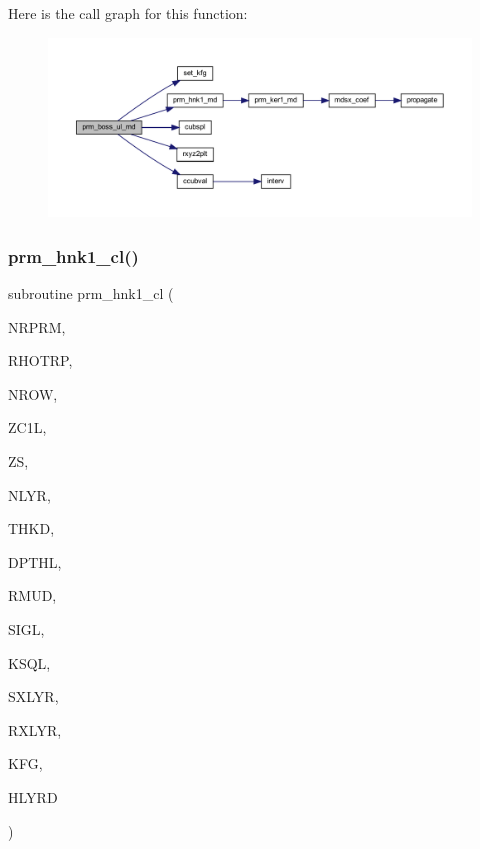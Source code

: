 Here is the call graph for this function\+:\nopagebreak
\begin{figure}[H]
\begin{center}
\leavevmode
\includegraphics[width=350pt]{Leroi__c_8f90_ab6689c64fba851d3db437dbd7fc0d13a_cgraph}
\end{center}
\end{figure}
\mbox{\label{Leroi__c_8f90_a5285d5a2942c499f6219805b1e689588}} 
\subsubsection{\texorpdfstring{prm\+\_\+hnk1\+\_\+cl()}{prm\_hnk1\_cl()}}
{\footnotesize\ttfamily subroutine prm\+\_\+hnk1\+\_\+cl (\begin{DoxyParamCaption}\item[{integer}]{N\+R\+P\+RM,  }\item[{real, dimension(nrprm)}]{R\+H\+O\+T\+RP,  }\item[{integer}]{N\+R\+OW,  }\item[{real, dimension(nrow)}]{Z\+C1L,  }\item[{real(kind=ql)}]{ZS,  }\item[{integer}]{N\+L\+YR,  }\item[{real(kind=ql), dimension (nlyr)}]{T\+H\+KD,  }\item[{real(kind=ql), dimension (nlyr)}]{D\+P\+T\+HL,  }\item[{real(kind=ql), dimension(0\+:nlyr)}]{R\+M\+UD,  }\item[{complex(kind=ql), dimension (nlyr)}]{S\+I\+GL,  }\item[{complex(kind=ql), dimension (nlyr)}]{K\+S\+QL,  }\item[{integer}]{S\+X\+L\+YR,  }\item[{integer}]{R\+X\+L\+YR,  }\item[{integer}]{K\+FG,  }\item[{complex(kind=ql), dimension(nrprm,3,nrow)}]{H\+L\+Y\+RD }\end{DoxyParamCaption})}


